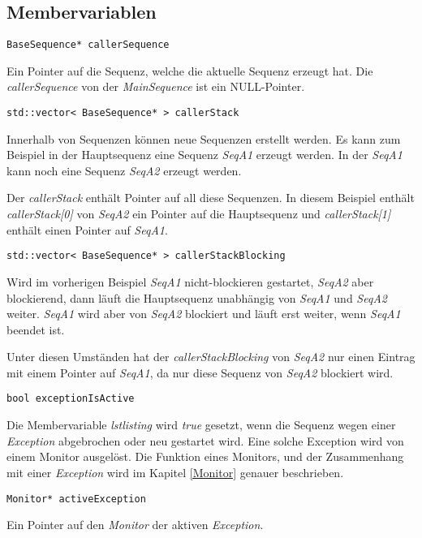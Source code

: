\subsection{Membervariablen}
\begin{lstlisting}
BaseSequence* callerSequence
\end{lstlisting}
Ein Pointer auf die Sequenz, welche die aktuelle Sequenz erzeugt hat.
Die \textit{callerSequence} von der \textit{MainSequence} ist ein NULL-Pointer.


\begin{lstlisting}
std::vector< BaseSequence* > callerStack
\end{lstlisting}
Innerhalb von Sequenzen können neue Sequenzen erstellt werden.
Es kann zum Beispiel in der Hauptsequenz eine Sequenz \textit{SeqA1} erzeugt werden.
In der \textit{SeqA1} kann noch eine Sequenz \textit{SeqA2} erzeugt werden.

Der \textit{callerStack} enthält Pointer auf all diese Sequenzen.
In diesem Beispiel enthält \textit{callerStack[0]} von \textit{SeqA2} ein Pointer auf die Hauptsequenz und \textit{callerStack[1]} enthält einen Pointer auf \textit{SeqA1}.


\begin{lstlisting}
std::vector< BaseSequence* > callerStackBlocking
\end{lstlisting}
Wird im vorherigen Beispiel \textit{SeqA1} nicht-blockieren gestartet, \textit{SeqA2} aber blockierend, dann läuft die Hauptsequenz unabhängig von \textit{SeqA1} und \textit{SeqA2} weiter.
\textit{SeqA1} wird aber von \textit{SeqA2} blockiert und läuft erst weiter, wenn \textit{SeqA1} beendet ist.

Unter diesen Umständen hat der \textit{callerStackBlocking} von \textit{SeqA2} nur einen Eintrag mit einem Pointer auf \textit{SeqA1}, da nur diese Sequenz von \textit{SeqA2} blockiert wird.


\begin{lstlisting}
bool exceptionIsActive 
\end{lstlisting}
Die Membervariable \textit{lstlisting} wird \textit{true} gesetzt, wenn die Sequenz wegen einer \textit{Exception} abgebrochen oder neu gestartet wird.
Eine solche Exception wird von einem Monitor ausgelöst.
Die Funktion eines Monitors, und der Zusammenhang mit einer \textit{Exception} wird im Kapitel \ref{Monitor} genauer beschrieben.


\begin{lstlisting}
Monitor* activeException
\end{lstlisting}
Ein Pointer auf den \textit{Monitor} der aktiven \textit{Exception}.


